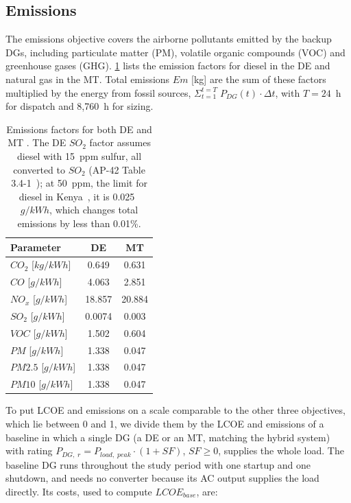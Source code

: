 \documentclass[final,3p,times]{elsarticle}
\begin{document}
\subsection{Emissions \label{sec:norm}}
The emissions objective covers the airborne pollutants emitted by the backup DGs, including particulate matter (PM), volatile organic compounds (VOC) and greenhouse gases (GHG). \cref{tab:emissions} lists the emission factors for diesel in the DE and natural gas in the MT. Total emissions $Em$ [kg] are the sum of these factors multiplied by the energy from fossil sources, $\Sigma_{t=1}^{t=T} \; P_{DG}(t) \cdot \Delta t$, with $T = 24$~h for dispatch and 8,760~h for sizing.

\begin{table}[htbp]
\centering
\begin{tabular}{@{}lcc@{}}
\toprule
\textbf{Parameter} & DE & MT \\ 
\midrule
$CO_2$ [$kg/kWh$] & 0.649 \cite{wu2016} & 0.631 \cite{chp_mt} \\
$CO$ [$g/kWh$] & 4.063 & 2.851\\
$NO_x$ [$g/kWh$] & 18.857 & 20.884\\
$SO_2$ [$g/kWh$] & 0.0074 & 0.003\\
$VOC$ [$g/kWh$] & 1.502 & 0.604\\
$PM$ [$g/kWh$] & 1.338 & 0.047\\
$PM2.5$ [$g/kWh$] & 1.338 & 0.047\\
$PM10$ [$g/kWh$] & 1.338 & 0.047\\
\bottomrule
\end{tabular}
\caption{Emissions factors for both DE and MT \cite{emissions}. The DE $SO_2$ factor assumes diesel with 15~ppm sulfur, all converted to $SO_2$ (AP-42 Table 3.4-1~\cite{ap42_34}); at 50~ppm, the limit for diesel in Kenya~\cite{bd_sulphur}, it is 0.025~$g/kWh$, which changes total emissions by less than 0.01\%.}
\label{tab:emissions}
\end{table}

To put LCOE and emissions on a scale comparable to the other three objectives, which lie between 0 and 1, we divide them by the LCOE and emissions of a baseline in which a single DG (a DE or an MT, matching the hybrid system) with rating $P_{DG,\;r} = P_{load,\; peak} \cdot (1+SF)$, $SF \geq 0$, supplies the whole load. The baseline DG runs throughout the study period with one startup and one shutdown, and needs no converter because its AC output supplies the load directly. Its costs, used to compute $LCOE_{base}$, are:
\end{document}
